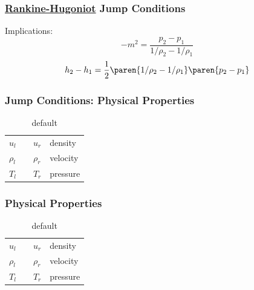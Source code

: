 %
\begin{frame}\frametitle{\href{https://en.wikipedia.org/wiki/Rankine\%E2\%80\%93Hugoniot_conditions}{Rankine-Hugoniot} Jump Conditions}
\center
	Implications:
\begin{equation}
	-m^{2} = \frac{p_{2} - p_{1}} { 1 / \rho_{2} - 1 / \rho_{1} }
\label{eq:Michelson–Rayleigh}
\end{equation}
%
\begin{equation}
	h_{2} - h_{1} = \frac{1}{2} \displaystyle\paren{ 1 / \rho_{2} - 1 / \rho_{1} } \paren{p_{2} - p_{1}}
\label{eq:enthalpy}
\end{equation}
\end{frame}

\begin{frame}\frametitle{Jump Conditions: Physical Properties}
\begin{table}[htp]
\caption{default}
\begin{center}
\begin{tabular}{lcll}
	$u_{l}$ && $u_{r}$ & density\\
	$\rho_{l}$ && $\rho_{r}$ & velocity\\
	$T_{l}$ && $T_{r}$ & pressure\\
\end{tabular}
\end{center}
\label{tab:}
\end{table}%
\end{frame}


\begin{frame}\frametitle{Physical Properties}
\begin{table}[htp]
\caption{default}
\begin{center}
\begin{tabular}{lcll}
	$u_{l}$ && $u_{r}$ & density\\
	$\rho_{l}$ && $\rho_{r}$ & velocity\\
	$T_{l}$ && $T_{r}$ & pressure\\
\end{tabular}
\end{center} 
\label{default}
\end{table}%
\end{frame}

